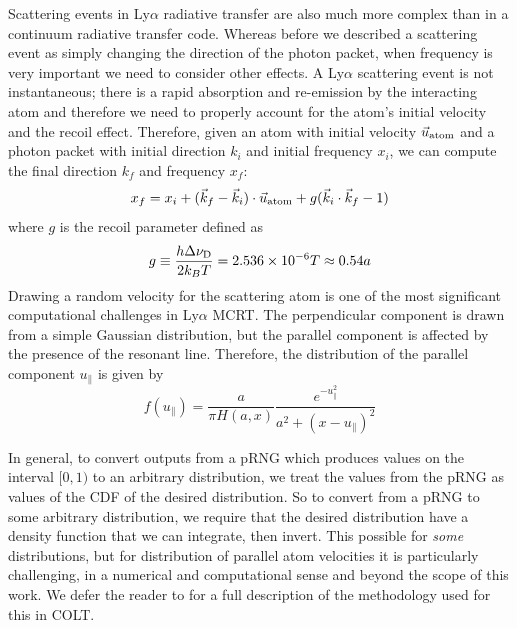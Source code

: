 Scattering events in Ly$\alpha$ radiative transfer are also much more complex than in a continuum radiative transfer code.
Whereas before we described a scattering event as simply changing the direction of the photon packet, when frequency is very important we need to consider other effects.
A Ly$\alpha$ scattering event is not instantaneous; there is a rapid absorption and re-emission by the interacting atom and therefore we need to properly account for the atom's initial velocity and the recoil effect.
Therefore, given an atom with initial velocity $\vec{u}_{\rm{atom}}$ and a photon packet with initial direction $k_{i}$ and initial frequency $x_{i}$, we can compute the final direction $k_{f}$ and frequency $x_{f}$:
\begin{equation}
    x_{f} = x_{i} + (\vec{k}_{f} - \vec{k}_{i})\cdot \vec{u}_{\rm{atom}} + g(\vec{k}_{i}\cdot\vec{k}_{f} - 1)
\end{equation}
where $g$ is the recoil parameter defined as
\begin{equation}
    g \equiv \frac{h\Delta\nu_{\rm{D}}}{2k_{B}T} = 2.536 \times 10^{-6}T \approx 0.54 a
\end{equation}
Drawing a random velocity for the scattering atom is one of the most significant computational challenges in Ly$\alpha$ MCRT.
The perpendicular component is drawn from a simple Gaussian distribution, but the parallel component is affected by the presence of the resonant line.
Therefore, the distribution of the parallel component $u_{\parallel}$ is given by
\begin{equation}
    f(u_{\parallel}) = \frac{a}{\pi H(a, x)}\frac{e^{-u_{\parallel}^{2}}}{a^{2} + (x - u_{\parallel})^{2}}
\end{equation}

In general, to convert outputs from a pRNG which produces values on the interval $[0, 1)$ to an arbitrary distribution, we treat the values from the pRNG as values of the CDF of the desired distribution.
So to convert from a pRNG to some arbitrary distribution, we require that the desired distribution have a density function that we can integrate, then invert.
This possible for \emph{some} distributions, but for distribution of parallel atom velocities it is particularly challenging, in a numerical and computational sense and beyond the scope of this work.
We defer the reader to \citep{Smith2015} for a full description of the methodology used for this in \textsc{COLT}.

